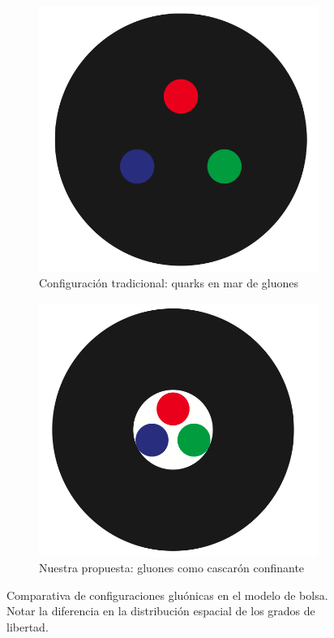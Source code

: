 \begin{figure}[h]
    \centering
    \begin{subfigure}{0.48\textwidth}
    \includegraphics[width=\textwidth]{./Images/Bag_model_sea_cropped.png}
    \caption{Configuración tradicional: quarks en mar de gluones}
    \label{fig:sea}
    \end{subfigure}
    \hfill
    \begin{subfigure}{0.48\textwidth}
    \includegraphics[width=\textwidth]{./Images/Bag_model_shell_cropped.png}
    \caption{Nuestra propuesta: gluones como cascarón confinante}
    \label{fig:shell}
    \end{subfigure}
    \caption{Comparativa de configuraciones gluónicas en el modelo de bolsa. Notar la diferencia en la distribución espacial de los grados de libertad.}
    \label{fig:configs}
\end{figure}

